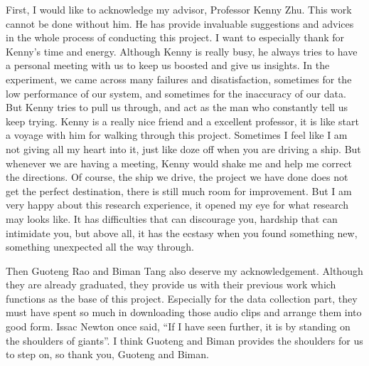 
\begin{thanks}
First, I would like to acknowledge my advisor, Professor Kenny Zhu. 
This work cannot be done without him. 
He has provide invaluable suggestions and advices in the whole process of conducting this project. 
I want to especially thank for Kenny's time and energy.
Although Kenny is really busy, he always tries to have a personal meeting with us to keep us boosted and give us insights.  
In the experiment, we came across many failures and disatisfaction, sometimes for the low performance of our system, and sometimes for the inaccuracy of our data. 
But Kenny tries to pull us through, and act as the man who constantly tell us keep trying. 
Kenny is a really nice friend and a excellent professor, it is like start a voyage with him for walking through this project. 
Sometimes I feel like I am not giving all my heart into it, just like doze off when you are driving a ship. 
But whenever we are having a meeting, Kenny would shake me and help me correct the directions. 
Of course, the ship we drive, the project we have done does not get the perfect destination, there is still much room for improvement. 
But I am very happy about this research experience, it opened my eye for what research may looks like. 
It has difficulties that can discourage you, hardship that can intimidate you, but above all, it has the ecstasy when you found something new, something unexpected all the way through.  

Then Guoteng Rao and Biman Tang also deserve my acknowledgement. 
Although they are already graduated, they provide us with their previous work which functions as the base of this project. 
Especially for the data collection part, they must have spent so much in downloading those audio clips and arrange them into good form. 
Issac Newton once said, ``If I have seen further, it is by standing on the shoulders of giants''. 
I think Guoteng and Biman provides the shoulders for us to step on, so thank you, Guoteng and Biman. 


\end{thanks}
